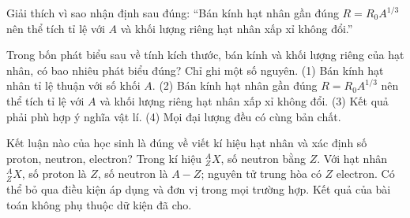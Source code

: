 \begin{bt}
Giải thích vì sao nhận định sau đúng: “Bán kính hạt nhân gần đúng $R=R_0A^{1/3}$ nên thể tích tỉ lệ với $A$ và khối lượng riêng hạt nhân xấp xỉ không đổi.”
\end{bt}

\begin{ex}
Trong bốn phát biểu sau về tính kích thước, bán kính và khối lượng riêng của hạt nhân, có bao nhiêu phát biểu đúng? Chỉ ghi một số nguyên. (1) Bán kính hạt nhân tỉ lệ thuận với số khối $A$. (2) Bán kính hạt nhân gần đúng $R=R_0A^{1/3}$ nên thể tích tỉ lệ với $A$ và khối lượng riêng hạt nhân xấp xỉ không đổi. (3) Kết quả phải phù hợp ý nghĩa vật lí. (4) Mọi đại lượng đều có cùng bản chất.
\end{ex}

\begin{ex}
Kết luận nào của học sinh là đúng về viết kí hiệu hạt nhân và xác định số proton, neutron, electron?
\choice
{Trong kí hiệu $^{A}_{Z}X$, số neutron bằng $Z$.}
{\True Với hạt nhân $^{A}_{Z}X$, số proton là $Z$, số neutron là $A-Z$; nguyên tử trung hòa có $Z$ electron.}
{Có thể bỏ qua điều kiện áp dụng và đơn vị trong mọi trường hợp.}
{Kết quả của bài toán không phụ thuộc dữ kiện đã cho.}
\end{ex}

